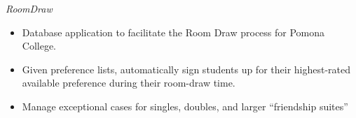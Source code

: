 {\sl RoomDraw}
\begin{itemize} \itemsep -2pt %
\item Database application to facilitate the Room Draw process for Pomona College.
\item Given preference lists, automatically sign students up for their highest-rated available preference during their room-draw time.
\item Manage exceptional cases for singles, doubles, and larger ``friendship suites''
\end{itemize}
